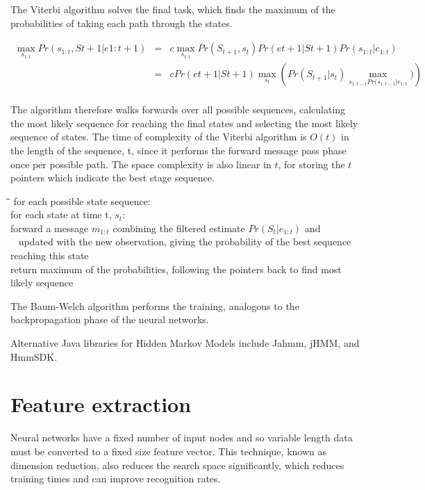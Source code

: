 \documentclass[12pt,a4,notitlepage]{report}
\renewcommand{\_}{\texttt{\symbol{95}}}
\newcommand{\<}{\texttt{\symbol{60}}}
\renewcommand{\>}{\texttt{\symbol{62}}}
\newenvironment{pseudocode}{\begin{slshape}\begin{tabbing}\hspace*{0.5cm}\=\hspace*{0.5cm}\=\hspace*{0.5cm}\= \kill }{\end{tabbing}\end{slshape}}
\begin{document}
The Viterbi algorithm solves the final task, which finds the maximum of the probabilities of taking each path through the states.

\begin{eqnarray*}
\max_{s_{1:t}} Pr(s_{1:t},S{t+1}|e{1:t+1}) &=& c \max_{s_{1:t}} Pr(S_{t+1},s_t) Pr(e{t+1}|S{t+1}) Pr(s_{1:t}|e_{1:t}) \\
 &=& c Pr (e{t+1}|S{t+1}) \max_{s_t}\left( Pr(S_{t+1}|s_t) \max_{s_{1:t-1} Pr(s_{1:t-1}|e_{1:t}}) \right) \\
\end{eqnarray*}

The algorithm therefore walks forwards over all possible sequences, calculating the most likely sequence for reaching the final states and selecting the most likely sequence of states. The time of complexity of the Viterbi algorithm is $O(t)$ in the length of the sequence, t, since it performs the forward message pass phase once per possible path. The space complexity is also linear in $t$, for storing the $t$ pointers which indicate the best stage sequence.

\begin{pseudocode}
for each possible state sequence: \\
\>  for each state at time t, $s_t$: \\
\>\>    forward a message $m_{1:t}$ combining the filtered estimate $Pr(S_t|e_{1:t})$ and \\\ \>\> updated with the new observation, giving the probability of the best sequence reaching this state \\
\> return maximum of the probabilities, following the pointers back to find most likely sequence \\
\end{pseudocode}

The Baum-Welch algorithm performs the training, analogous to the backpropagation phase of the neural networks.\cite{Baum-Welch}


Alternative Java libraries for Hidden Markov Models include Jahmm, jHMM, and HmmSDK.

\section{Feature extraction}

Neural networks have a fixed number of input nodes and so variable length data must be converted to a fixed size feature vector. This technique, known as dimension reduction, also reduces the search space significantly, which reduces training times and can improve recognition rates.
\end{document}
